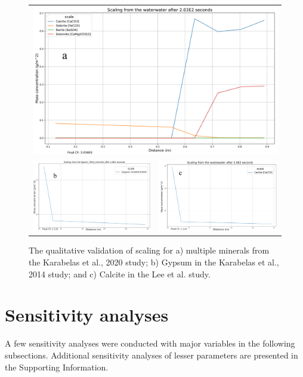 \begin{figure}
    \begin{tabular}{c|c}
        \multicolumn{2}{c}{\includegraphics[width=\linewidth]{images/ROSSpy/case_studies/Karabelas_2020_wateq4.png}} \\
        \includegraphics[width=0.49\linewidth]{images/ROSSpy/case_studies/Karabelas_2014_pitzer.png} 
        & \includegraphics[width=0.49\linewidth]{images/ROSSpy/case_studies/Lee_pitzer.png} \\
    \end{tabular}
    \caption{
        The qualitative validation of scaling for a) multiple minerals from the Karabelas et al., 2020 study; b) Gypsum in the Karabelas et al., 2014 study; and c) Calcite in the Lee et al. study. 
    }
    \label{qualitative_scaling}
\end{figure}


\section{Sensitivity analyses}
A few sensitivity analyses were conducted with major variables in the following subsections. Additional sensitivity analyses of lesser parameters are presented in the Supporting Information.

